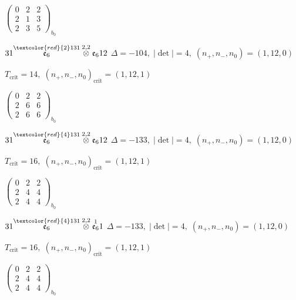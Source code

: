 \documentclass[10pt]{article}
\begin{document}
\hspace{2em}$\left(\begin{smallmatrix}0 & 2 & 2 \\ 2 & 1 & 3 \\ 2 & 3 & 5\end{smallmatrix}\right)_{\!b_0}$

\smallskip

$31\overset{\textcolor{red}{2}131}{\mathfrak{e}_6}\overset{2,2}{\otimes}\mathfrak{e}_612$ \quad $\Delta=-104,\; |\det|=4,\; (n_+,n_-,n_0)=(1,12,0)$

\hspace{1em}$T_{\text{crit}}=14,\; (n_+,n_-,n_0)_{\text{crit}}=(1,12,1)$

\hspace{2em}$\left(\begin{smallmatrix}0 & 2 & 2 \\ 2 & 6 & 6 \\ 2 & 6 & 6\end{smallmatrix}\right)_{\!b_0}$

$31\overset{\textcolor{red}{4}131}{\mathfrak{e}_6}\overset{2,2}{\otimes}\mathfrak{e}_612$ \quad $\Delta=-133,\; |\det|=4,\; (n_+,n_-,n_0)=(1,12,0)$

\hspace{1em}$T_{\text{crit}}=16,\; (n_+,n_-,n_0)_{\text{crit}}=(1,12,1)$

\hspace{2em}$\left(\begin{smallmatrix}0 & 2 & 2 \\ 2 & 4 & 4 \\ 2 & 4 & 4\end{smallmatrix}\right)_{\!b_0}$

\smallskip

$31\overset{\textcolor{red}{4}131}{\mathfrak{e}_6}\overset{2,2}{\otimes}\overset{1}{\mathfrak{e}_6}1$ \quad $\Delta=-133,\; |\det|=4,\; (n_+,n_-,n_0)=(1,12,0)$

\hspace{1em}$T_{\text{crit}}=16,\; (n_+,n_-,n_0)_{\text{crit}}=(1,12,1)$

\hspace{2em}$\left(\begin{smallmatrix}0 & 2 & 2 \\ 2 & 4 & 4 \\ 2 & 4 & 4\end{smallmatrix}\right)_{\!b_0}$
\end{document}
